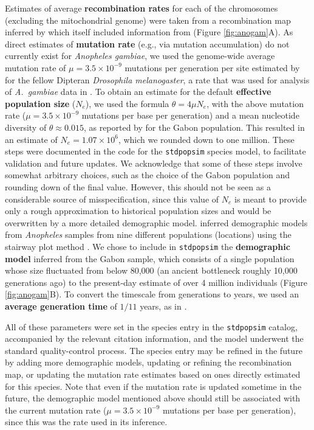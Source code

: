 \documentclass[hidelinks]{article}
\newcommand{\stdpopsim}{\texttt{stdpopsim}\xspace}
\begin{document}
Estimates of average \textbf{recombination rates} for each of the chromosomes (excluding the mitochondrial genome)
were taken from a recombination map inferred by \citet{Pombi2006} which itself included information from
\citet{zheng1996integrated} (Figure \ref{fig:anogam}A).
As direct estimates of \textbf{mutation rate} (e.g., via mutation accumulation) do not currently exist for \emph{Anopheles gambiae},
we used the genome-wide average mutation rate of $\mu=3.5 \times 10^{-9}$ mutations per generation per site
estimated by \cite{Keightley2009} for the fellow Dipteran \textit{Drosophila melanogaster},
a rate that was used for analysis of \textit{A.~gambiae} data in \citet{Miles2017}.
To obtain an estimate for the default \textbf{effective population size} ($N_e$),
we used the formula $\theta=4\mu N_e$,
with the above mutation rate ($\mu=3.5 \times 10^{-9}$
mutations per base per generation)
and a mean nucleotide diversity of $\theta\approx 0.015$,
as reported by \citet{Miles2017} for the Gabon population.
This resulted in an estimate of $N_e=1.07\times 10^{6}$,
which we rounded down to one million. 
These steps were documented in the code for the \stdpopsim species model,
to facilitate validation and future updates.
We acknowledge that some of these steps involve somewhat arbitrary choices,
such as the choice of the Gabon population and rounding down of the final value.
However, this should not be seen as a considerable source of misspecification,
since this value of $N_e$ is meant to provide only a rough approximation to
historical population sizes and would be overwritten by a more detailed demographic model.
\citet{Miles2017} inferred {demographic models} from \textit{Anopheles} samples from nine different populations (locations) using the stairway plot method \citep{Liu2015}.
We chose to include in \stdpopsim the \textbf{demographic model} inferred from the Gabon sample, 
which consists of a single population whose size fluctuated from below 80,000
(an ancient bottleneck roughly 10,000 generations ago) to the present-day estimate of over 4 million individuals (Figure \ref{fig:anogam}B).
To convert the timescale from generations to years,
we used an \textbf{average generation time} of $1/11$ years,
as in \cite{Miles2017}.


All of these parameters were set in the species entry in the \stdpopsim catalog,
accompanied by the relevant citation information,
and the model underwent the standard quality-control process.
The species entry may be refined in the future by adding more demographic models,
updating or refining the recombination map,
or updating the mutation rate estimates based on ones directly estimated for this species.
Note that even if the mutation rate is updated sometime in the future,
the demographic model mentioned above should still be associated with the current
mutation rate ($\mu=3.5 \times 10^{-9}$
mutations per base per generation),
since this was the rate used in its inference.
\end{document}
